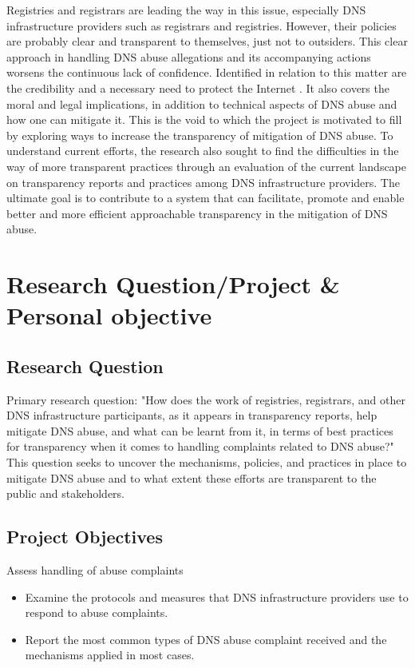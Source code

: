 Registries and registrars are leading the way in this issue, especially DNS infrastructure providers such as registrars and registries. However, their policies are probably clear and transparent to themselves, just not to outsiders.  This clear approach in handling DNS abuse allegations and its accompanying actions worsens the continuous lack of confidence. Identified in relation to this matter are the credibility and a necessary need to protect the Internet \cite{cerf2022}. It also covers the moral and legal implications, in addition to technical aspects of DNS abuse and how one can mitigate it. This is the void to which the project is motivated to fill by exploring ways to increase the transparency of mitigation of DNS abuse. To understand current efforts, the research also sought to find the difficulties in the way of more transparent practices through an evaluation of the current landscape on transparency reports and practices among DNS infrastructure providers. The ultimate goal is to contribute to a system that can facilitate, promote and enable better and more efficient approachable transparency in the mitigation of DNS abuse.


\section{Research Question/Project \& Personal objective} 
\subsection{Research Question}

Primary research question: "How does the work of registries, registrars, and other DNS infrastructure participants, as it appears in transparency reports, help mitigate DNS abuse, and what can be learnt from it, in terms of best practices for transparency when it comes to handling complaints related to DNS abuse?" This question seeks to uncover the mechanisms, policies, and practices in place to mitigate DNS abuse and to what extent these efforts are transparent to the public and stakeholders.

\subsection{Project Objectives}

Assess handling of abuse complaints

\begin{itemize}
  \item Examine the protocols and measures that DNS infrastructure providers use to respond to abuse complaints.
  \item Report the most common types of DNS abuse complaint received and the mechanisms applied in most cases.
\end{itemize}

